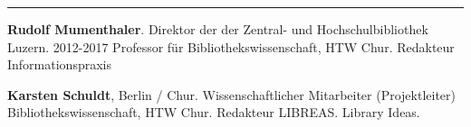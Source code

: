 \begin{center}\rule{0.5\linewidth}{\linethickness}\end{center}

\textbf{Rudolf Mumenthaler}. Direktor der der Zentral- und
Hochschulbibliothek Luzern. 2012-2017 Professor für
Bibliothekswissenschaft, HTW Chur. Redakteur Informationspraxis

\textbf{Karsten Schuldt}, Berlin / Chur. Wissenschaftlicher Mitarbeiter
(Projektleiter) Bibliothekswissenschaft, HTW Chur. Redakteur LIBREAS.
Library Ideas.
